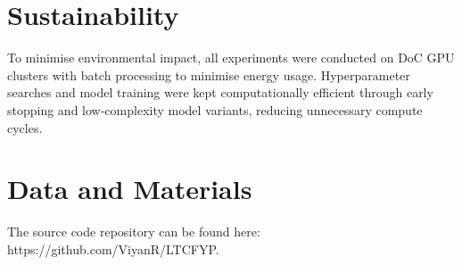 \section{Sustainability}

To minimise environmental impact, all experiments were conducted on DoC GPU clusters with batch processing to minimise energy usage. Hyperparameter searches and model training were kept computationally efficient through early stopping and low-complexity model variants, reducing unnecessary compute cycles.

\section{Data and Materials}

The source code repository can be found here: https://github.com/ViyanR/LTCFYP.